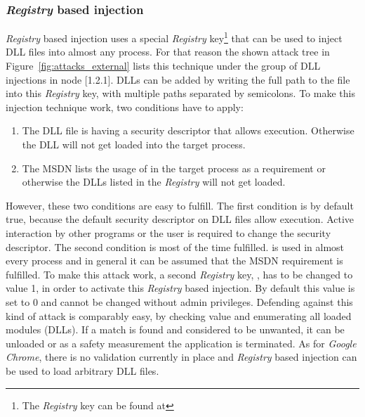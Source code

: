 \subsubsection{\emph{Registry} based injection}
\emph{Registry} based injection uses a special \emph{Registry} key\footnote{The \emph{Registry} key can be found at } that can be used to inject \gls{DLL} files into almost any process. For that reason the shown attack tree in Figure~\ref{fig:attacks_external} lists this technique under the group of \gls{DLL} injections in node [1.2.1]. \glspl{DLL} can be added by writing the full path to the file into this \emph{Registry} key, with multiple paths separated by semicolons. To make this injection technique work, two conditions have to apply:
\begin{enumerate}
\item The \gls{DLL} file is having a security descriptor that allows execution. Otherwise the \gls{DLL} will not get loaded into the target process.
\item The \gls{MSDN} \cite{msdn_appinitdlls} lists the usage of  in the target process as a requirement or otherwise the \glspl{DLL} listed in the \emph{Registry} will not get loaded.
\end{enumerate}
However, these two conditions are easy to fulfill. The first condition is by default true, because the default security descriptor on \gls{DLL} files allow execution. Active interaction by other programs or the user is required to change the security descriptor. The second condition is most of the time fulfilled.  is used in almost every process and in general it can be assumed that the \gls{MSDN} requirement is fulfilled. To make this attack work, a second \emph{Registry} key, , has to be changed to value 1, in order to activate this \emph{Registry} based injection. By default this value is set to 0 and cannot be changed without admin privileges.
Defending against this kind of attack is comparably easy, by checking  value and enumerating all loaded modules (\glspl{DLL}). If a match is found and considered to be unwanted, it can be unloaded or as a safety measurement the application is terminated. As for \emph{Google Chrome}, there is no validation currently in place and \emph{Registry} based injection can be used to load arbitrary \gls{DLL} files.
